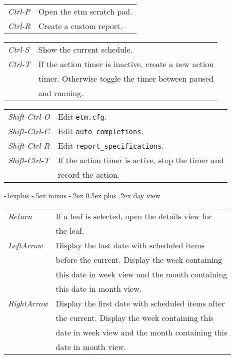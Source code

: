 \documentclass[10pt,landscape]{article}
\makeatletter
\renewcommand{\subsection}{\@startsection{subsection}{2}{0mm}%
                                {-1explus -.5ex minus -.2ex}%
                                {0.5ex plus .2ex}%
                                {\normalfont\normalsize\bfseries}}
\makeatother
\begin{document}
\begin{multicols}{3}
\begin{tabular}{@{}ll@{}}
\emph{Ctrl-P}        & Open the etm scratch pad. \\
\emph{Ctrl-R}        & Create a custom report. \\
\end{tabular}
\begin{tabular}{@{}ll@{}}
\emph{Ctrl-S}        & Show the current schedule. \\
\emph{Ctrl-T}        & If the action timer is inactive, create a new action \\
                        & timer. Otherwise toggle the timer between paused \\
                        & and running. \\
\end{tabular}
\begin{tabular}{@{}ll@{}}
\emph{Shift-Ctrl-O}  & Edit \verb'etm.cfg'. \\
\emph{Shift-Ctrl-C}  & Edit \verb'auto_completions'. \\
\emph{Shift-Ctrl-R}  & Edit \verb'report_specifications'. \\
\emph{Shift-Ctrl-T}  & If the action timer is active, stop the timer and \\
                        & record the action. \\
\end{tabular}

\subsection{day view}

\begin{tabular}{@{}ll@{}}
\emph{Return}     & If a leaf is selected, open the details view for \\
                  & the leaf. \\
\emph{LeftArrow}  & Display the last date with scheduled items \\
                  & before the current. Display the week containing \\
                  & this date in week view and the month containing \\
                  & this date in month view. \\
\emph{RightArrow} & Display the first date with scheduled items after \\
                  & the current. Display the week containing this \\
                  & date in week view and the month containing this \\
                  & date in month view. \\
\end{tabular}



\end{multicols}
\end{document}
